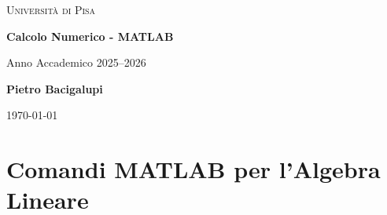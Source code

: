 \documentclass[a4paper,12pt]{article}
\begin{document}
	
	\begin{titlepage}
		\centering
		
		{\scshape\LARGE Università di Pisa \par}
		\vspace{0.5cm}
		
		{\Huge\bfseries Calcolo Numerico - MATLAB\par}
		\vspace{0.5cm}
		{\Large Anno Accademico 2025--2026 \par}
		
		\vfill
		
		{\Large\textbf{Pietro Bacigalupi} \par}
		\vspace{0.5cm}
		
		\vfill
		
		{\large \today\par}
		
	\end{titlepage}
	
	\tableofcontents
	\newpage
	\section*{Comandi MATLAB per l'Algebra Lineare}
	
\end{document}
